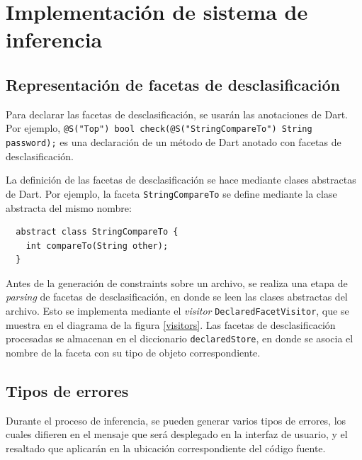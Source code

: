 \section{Implementación de sistema de inferencia}

\subsection{Representación de facetas de desclasificación}
Para declarar las facetas de desclasificación, se usarán las anotaciones de Dart. Por ejemplo, \texttt{@S("Top") bool check(@S("StringCompareTo") String password);} es una declaración de un método de Dart anotado con facetas de desclasificación.

La definición de las facetas de desclasificación se hace mediante clases abstractas de Dart. Por ejemplo, la faceta \texttt{StringCompareTo} se define mediante la clase abstracta del mismo nombre:

\begin{lstlisting}
  abstract class StringCompareTo {
    int compareTo(String other);
  }
\end{lstlisting}

Antes de la generación de constraints sobre un archivo, se realiza una etapa de \textit{parsing} de facetas de desclasificación, en donde se leen las clases abstractas del archivo. Esto se implementa mediante el \textit{visitor} \texttt{DeclaredFacetVisitor}, que se muestra en el diagrama de la figura \ref{visitors}. Las facetas de desclasificación procesadas se almacenan en el diccionario \texttt{declaredStore}, en donde se asocia el nombre de la faceta con su tipo de objeto correspondiente.

\subsection{Tipos de errores}
Durante el proceso de inferencia, se pueden generar varios tipos de errores, los cuales difieren en el mensaje que será desplegado en la interfaz de usuario, y el resaltado que aplicarán en la ubicación correspondiente del código fuente.

